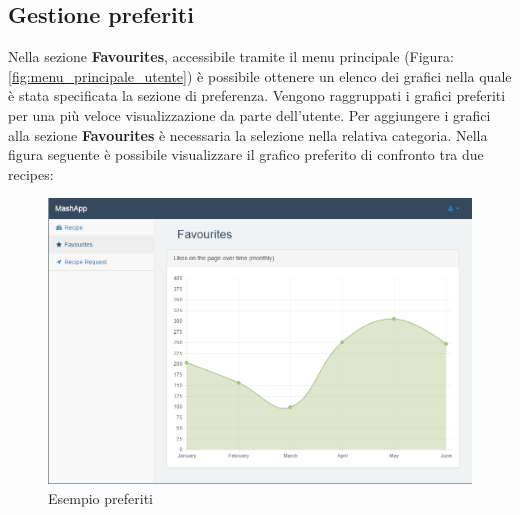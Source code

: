 	\subsection{Gestione preferiti} %
	\label{sec:gestione_preferiti}
		Nella sezione \textbf{Favourites}, accessibile tramite il menu principale (Figura: \ref{fig:menu_principale_utente}) è possibile ottenere un elenco dei grafici nella quale è stata specificata la sezione di preferenza. Vengono raggruppati i grafici preferiti per una più veloce visualizzazione da parte dell'utente.\newline
		Per aggiungere i grafici alla sezione \textbf{Favourites} è necessaria la selezione nella relativa categoria.\newline
		Nella figura seguente è possibile visualizzare il grafico preferito di confronto tra due recipes\gloss{}:
		\begin{figure}[H]
			\centering
			\centerline{\includegraphics[width=14cm]{images/esempio_preferiti.png}}
			\caption{Esempio preferiti}
			\label{fig:esempio_preferiti}
		\end{figure}


	\pagebreak
